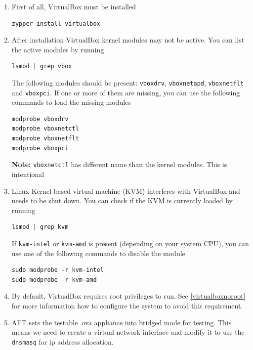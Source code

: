 \documentclass[a4paper,11pt]{article}
\newcommand{\note}{\textbf{Note: }}
\newcommand{\cmd}[1]{\texttt{#1}}
\begin{document}
\begin{enumerate}

\item
First of all, VirtualBox must be installed

\begin{lstlisting}
zypper install virtualbox
\end{lstlisting}

\item 
After installation VirtualBox kernel modules may not be active. You can list the active modules by running

\begin{lstlisting}
lsmod | grep vbox
\end{lstlisting}

The following modules should be present: \cmd{vboxdrv}, \cmd{vboxnetapd}, \cmd{vboxnetflt} and \cmd{vboxpci}. If one or more of them are missing, you can use the following commands to load the missing modules

\begin{lstlisting}
modprobe vboxdrv
modprobe vboxnetctl
modprobe vboxnetflt
modprobe vboxpci
\end{lstlisting}

\note \cmd{vboxnetctl} has different name than the kernel modules. This is intentional

\item
Linux Kernel-based virtual machine (KVM) interferes with VirtualBox and needs to be shut down. You can check if the KVM is currently loaded by running

\begin{lstlisting}
lsmod | grep kvm
\end{lstlisting}

If \cmd{kvm-intel} or \cmd{kvm-amd} is present (depending on your system CPU), you can use one of the following commands to disable the module

\begin{lstlisting}
sudo modprobe -r kvm-intel
sudo modprobe -r kvm-amd 
\end{lstlisting}

\item 
By default, VirtualBox requires root privileges to run. See \ref{virtualboxnoroot} for more information how to configure the system to avoid this requirement.

\item
AFT sets the testable .ova appliance into bridged mode for testing. This means we need to create a virtual network interface and modify it to use the \cmd{dnsmasq} for ip address allocation.


\end{enumerate}
\end{document}
